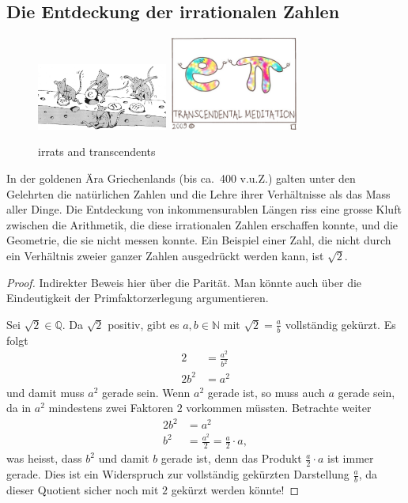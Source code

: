 \documentclass[%
11pt,%
twoside,%
titlepage,%
swissgerman,%
headsepline%
]{scrartcl}
\theoremstyle{definition}
\theoremstyle{plain}
\begin{document}
\subsection{Die Entdeckung der irrationalen Zahlen}
\begin{figure}
  \begin{center}
    \includegraphics[width=0.382\textwidth]{pictures/irratzahlen}\hspace{2cm}
    \includegraphics[width=0.382\textwidth]{pictures/transzendent}
  \end{center}
\caption{irrats and transcendents}
\end{figure}

In der goldenen Ära Griechenlands (bis ca.\ 400 v.u.Z.) galten unter den Gelehrten die natürlichen Zahlen und die Lehre ihrer Verhältnisse als das Mass aller Dinge. Die
Entdeckung von inkommensurablen Längen riss eine
grosse Kluft zwischen die Arithmetik, die diese  irrationalen Zahlen erschaffen konnte, und die Geometrie, die sie
nicht messen konnte. Ein Beispiel einer Zahl, die nicht durch ein
Verhältnis zweier ganzer Zahlen ausgedrückt werden kann, ist $\sqrt{2}$.

\begin{proof}
Indirekter
Beweis hier über die Parität. Man könnte auch über die Eindeutigkeit der Primfaktorzerlegung argumentieren.

Sei $\sqrt{2}\in\mathbb{Q}$. Da $\sqrt{2}$ positiv, gibt es $a,b\in\mathbb{N}$ mit $\sqrt{2}=\frac{a}{b}$ vollständig gekürzt. Es folgt
\begin{align*}
    2 &= \frac{a^2}{b^2}\\
    2b^2 &= a^2
\end{align*}
und damit muss $a^2$ gerade sein. Wenn $a^2$ gerade ist, so muss auch $a$ gerade sein, da in $a^2$ mindestens zwei Faktoren $2$ vorkommen müssten. Betrachte weiter
\begin{align*}
    2b^2 &= a^2\\
    b^2 &= \frac{a^2}{2}=\frac{a}{2}\cdot a,
\end{align*}
was heisst, dass $b^2$ und damit $b$ gerade ist, denn das Produkt $\frac{a}{2}\cdot a$ ist immer gerade. Dies ist ein Widerspruch zur vollständig gekürzten Darstellung $\frac{a}{b}$, da dieser Quotient sicher noch mit $2$ gekürzt werden könnte!
\end{proof}
\end{document}
